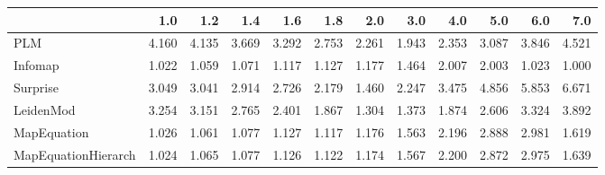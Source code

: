 \begin{tabular}{lrrrrrrrrrrr}
\toprule
{} &   1.0 &   1.2 &   1.4 &   1.6 &   1.8 &   2.0 &   3.0 &   4.0 &   5.0 &   6.0 &   7.0 \\
\midrule
PLM                 & 4.160 & 4.135 & 3.669 & 3.292 & 2.753 & 2.261 & 1.943 & 2.353 & 3.087 & 3.846 & 4.521 \\
Infomap             & 1.022 & 1.059 & 1.071 & 1.117 & 1.127 & 1.177 & 1.464 & 2.007 & 2.003 & 1.023 & 1.000 \\
Surprise            & 3.049 & 3.041 & 2.914 & 2.726 & 2.179 & 1.460 & 2.247 & 3.475 & 4.856 & 5.853 & 6.671 \\
LeidenMod           & 3.254 & 3.151 & 2.765 & 2.401 & 1.867 & 1.304 & 1.373 & 1.874 & 2.606 & 3.324 & 3.892 \\
MapEquation         & 1.026 & 1.061 & 1.077 & 1.127 & 1.117 & 1.176 & 1.563 & 2.196 & 2.888 & 2.981 & 1.619 \\
MapEquationHierarch & 1.024 & 1.065 & 1.077 & 1.126 & 1.122 & 1.174 & 1.567 & 2.200 & 2.872 & 2.975 & 1.639 \\
\bottomrule
\end{tabular}
